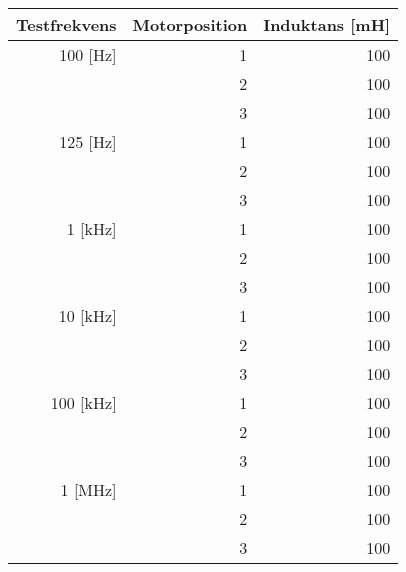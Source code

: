 \begin{tabular}{r|r|r}
Testfrekvens&Motorposition&Induktans [mH] \\\hline\hline
100 [Hz]&1&100 \\
 &2&100 \\
 &3&100 \\\hline
125 [Hz]&1&100 \\
 &2&100 \\
 &3&100 \\\hline
1 [kHz]&1&100 \\
 &2&100 \\
 &3&100 \\\hline
10 [kHz]&1&100 \\
 &2&100 \\
 &3&100 \\\hline
100 [kHz]&1&100 \\
 &2&100 \\
 &3&100 \\\hline
1 [MHz]&1&100 \\
 &2&100 \\
 &3&100 \\
\end{tabular}
